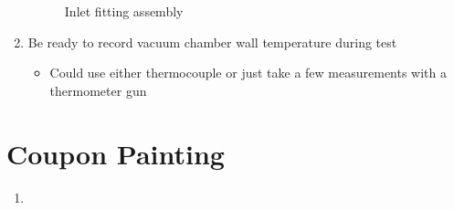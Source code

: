 \documentclass[11pt]{article}
\begin{document}
\begin{enumerate}
\begin{figure}[h]
                \caption{Inlet fitting assembly}
            \end{figure}
            \item Be ready to record vacuum chamber wall temperature during test
            \begin{itemize}
                \item Could use either thermocouple or just take a few measurements with a thermometer gun
            \end{itemize}
        \end{enumerate}

    \section{Coupon Painting}
        \begin{enumerate}
            \item 
        \end{enumerate}
\end{document}
